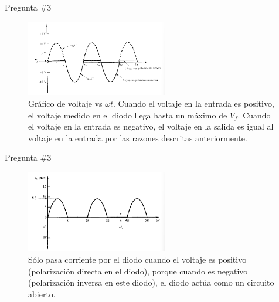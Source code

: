 \documentclass[
    10pt,
    aspectratio=169,
    xcolor={dvipsnames},
    spanish,
    ]{beamer}
\begin{document}
\begin{frame}{Pregunta \#3}
  \begin{figure}[H]
    \centering
    \includegraphics[width=0.55\textwidth]{Auxiliar_4_15}
  \caption{Gráfico de voltaje vs $\omega t$. Cuando el voltaje en la entrada es positivo, el voltaje medido en el diodo llega hasta un máximo de $V_f$. Cuando el voltaje en la entrada es negativo, el voltaje en la salida es igual al voltaje en la entrada por las razones descritas anteriormente.}
    \label{fig:voltaje-corriente-diodo}
\end{figure}
\end{frame}
\begin{frame}{Pregunta \#3}
\begin{figure}[H]
    \centering
    \includegraphics[width=0.55\textwidth]{Auxiliar_4_16}
  \caption{Sólo pasa corriente por el diodo cuando el voltaje es positivo (polarización directa en el diodo), porque cuando es negativo (polarización inversa en este diodo), el diodo actúa como un circuito abierto.}
    \label{fig:voltaje-corriente-diodo-detalle}
\end{figure}
\end{frame}
\end{document}

